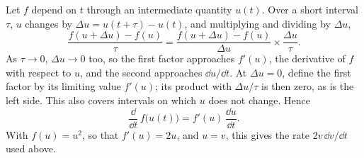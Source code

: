 \begin{toolbox}
Let $f$ depend on $t$ through an intermediate quantity $u(t)$. Over a short
interval $\tau$, $u$ changes by $\Delta u = u(t+\tau) - u(t)$, and
multiplying and dividing by $\Delta u$,
\begin{equation*}
   \frac{f(u + \Delta u) - f(u)}{\tau}
   = \frac{f(u + \Delta u) - f(u)}{\Delta u}\times\frac{\Delta u}{\tau} .
\end{equation*}
As $\tau \to 0$, $\Delta u \to 0$ too, so the first factor approaches
$f'(u)$, the derivative of $f$ with respect to $u$, and the second
approaches $\dd u/\dd t$. At $\Delta u = 0$, define the first factor by
its limiting value $f'(u)$; its product with $\Delta u/\tau$ is then zero,
as is the left side. This also covers intervals on which $u$ does not
change. Hence
\begin{equation*}
   \frac{\dd}{\dd t}\,f\bigl(u(t)\bigr) = f'(u)\,\frac{\dd u}{\dd t}.
\end{equation*}
With $f(u) = u^2$, so that $f'(u) = 2u$, and $u = v$, this gives the rate
$2v\,\dd v/\dd t$ used above.
\end{toolbox}


